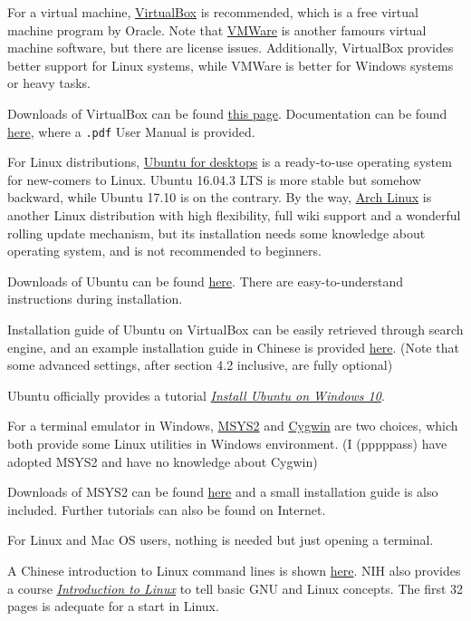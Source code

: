 \documentclass[english]{../TeXTemplate/pkupaper}
\begin{document}
For a virtual machine, \href{https://www.virtualbox.org/}{VirtualBox} is recommended, which is a free virtual machine program by Oracle. Note that \href{https://www.vmware.com/}{VMWare} is another famours virtual machine software, but there are license issues. Additionally, VirtualBox provides better support for Linux systems, while VMWare is better for Windows systems or heavy tasks.

Downloads of VirtualBox can be found \href{https://www.virtualbox.org/wiki/Downloads}{this page}. Documentation can be found \href{https://www.virtualbox.org/wiki/Documentation}{here}, where a \verb".pdf" User Manual is provided.

For Linux distributions, \href{https://www.ubuntu.com/desktop}{Ubuntu for desktops} is a ready-to-use operating system for new-comers to Linux. Ubuntu 16.04.3 LTS is more stable but somehow backward, while Ubuntu 17.10 is on the contrary. By the way, \href{https://www.archlinux.org/}{Arch Linux} is another Linux distribution with high flexibility, full wiki support and a wonderful rolling update mechanism, but its installation needs some knowledge about operating system, and is not recommended to beginners.

Downloads of Ubuntu can be found \href{https://www.ubuntu.com/download/desktop}{here}. There are easy-to-understand instructions during installation.

Installation guide of Ubuntu on VirtualBox can be easily retrieved through search engine, and an example installation guide in Chinese is provided \href{http://www.linuxidc.com/Linux/2016-08/134580.htm}{here}. (Note that some advanced settings, after section 4.2 inclusive, are fully optional)

Ubuntu officially provides a tutorial \href{https://tutorials.ubuntu.com/tutorial/tutorial-ubuntu-on-windows}{\emph{Install Ubuntu on Windows 10}}.

For a terminal emulator in Windows, \href{http://www.msys2.org/}{MSYS2} and \href{https://www.cygwin.com/}{Cygwin} are two choices, which both provide some Linux utilities in Windows environment. (I (pppppass) have adopted MSYS2 and have no knowledge about Cygwin)

Downloads of MSYS2 can be found \href{http://www.msys2.org/}{here} and a small installation guide is also included. Further tutorials can also be found on Internet.

For Linux and Mac OS users, nothing is needed but just opening a terminal.

A Chinese introduction to Linux command lines is shown \href{https://linux.cn/article-6160-1.html}{here}. NIH also provides a course \href{https://hpc.nih.gov/training/handouts/Linux_NIH_2017.pdf}{\emph{Introduction to Linux}} to tell basic GNU and Linux concepts. The first 32 pages is adequate for a start in Linux.
\end{document}
